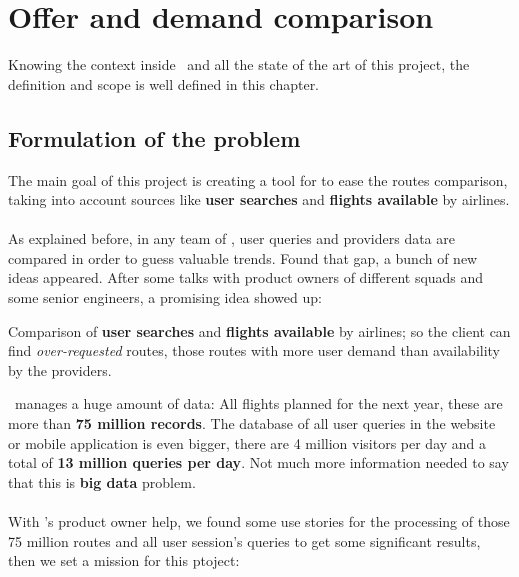 
\chapter{Offer and demand comparison}

\label{chapter03}

Knowing the context inside \company\ and all the state of the art of this project, the definition and scope is well defined in this chapter.


\section{Formulation of the problem} \label{problem}

The main goal of this project is creating a tool for \textit{\company} to ease the routes comparison, taking into account sources like \textbf{user searches} and \textbf{flights available} by airlines.
\\\\
As explained before, in any team of \company, user queries and providers data are compared in order to guess valuable trends. Found that gap, a bunch of new ideas appeared. After some talks with product owners of different squads and some senior engineers, a promising idea showed up:

\begin{displayquote}
Comparison of \textbf{user searches} and \textbf{flights available} by airlines; so the client can find \textit{over-requested} routes, those routes with more user demand than availability by the providers.
\end{displayquote}

\squad\ manages a huge amount of data: All flights planned for the next year, these are more than \textbf{75 million records}. The database of all user queries in the website or mobile application is even bigger, there are 4 million visitors per day and a total of \textbf{13 million queries per day}. Not much more information needed to say that this is \textbf{big data} problem.
\\\\
With \squad's product owner help, we found some use stories for the processing of those 75 million routes and all user session's queries to get some significant results, then we set a mission for this ptoject:

